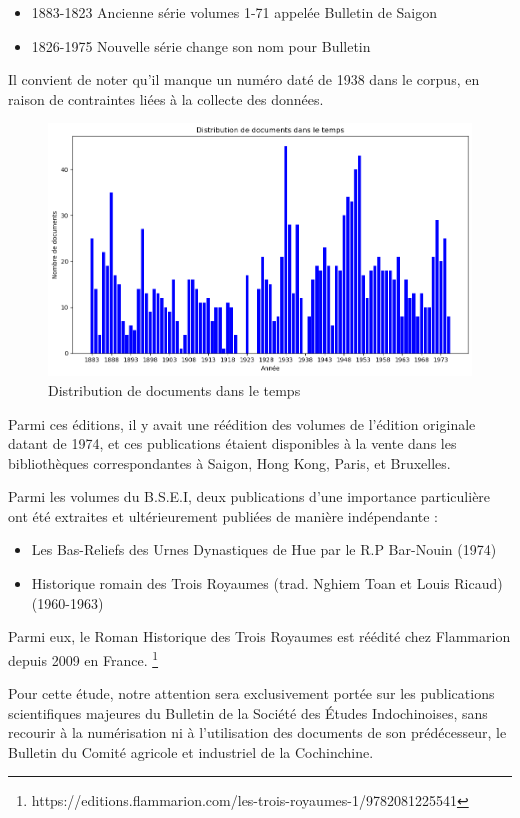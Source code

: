 \begin{itemize}
    \item 1883-1823 Ancienne série volumes 1-71 appelée Bulletin de Saigon
    \item  1826-1975 Nouvelle série change son nom pour Bulletin
\end{itemize}
Il convient de noter qu'il manque un numéro daté de 1938 dans le corpus, en raison de contraintes liées à la collecte des données.
\begin{figure}
    \centering
    \includegraphics[width=1\linewidth]{img/2.1.nb_doc_year.png}
    \caption{Distribution de documents dans le temps}
    \label{fig:nb_doc_year}
\end{figure}

Parmi ces éditions, il y avait une réédition des volumes de l'édition originale datant de 1974, et ces publications étaient disponibles à la vente dans les bibliothèques correspondantes à Saigon, Hong Kong, Paris, et Bruxelles.

Parmi les volumes du B.S.E.I, deux publications d'une importance particulière ont été extraites et ultérieurement publiées de manière indépendante : 
\begin{itemize}
    \item Les Bas-Reliefs des Urnes Dynastiques de Hue par le R.P Bar-Nouin (1974)
    \item Historique romain des Trois Royaumes (trad. Nghiem Toan et Louis Ricaud) (1960-1963)  
\end{itemize}

Parmi eux, le Roman Historique des Trois Royaumes est réédité chez Flammarion depuis 2009 en France. \footnote{https://editions.flammarion.com/les-trois-royaumes-1/9782081225541}

Pour cette étude, notre attention sera exclusivement portée sur les publications scientifiques majeures du Bulletin de la Société des Études Indochinoises, sans recourir à la numérisation ni à l'utilisation des documents de son prédécesseur, le Bulletin du Comité agricole et industriel de la Cochinchine.

